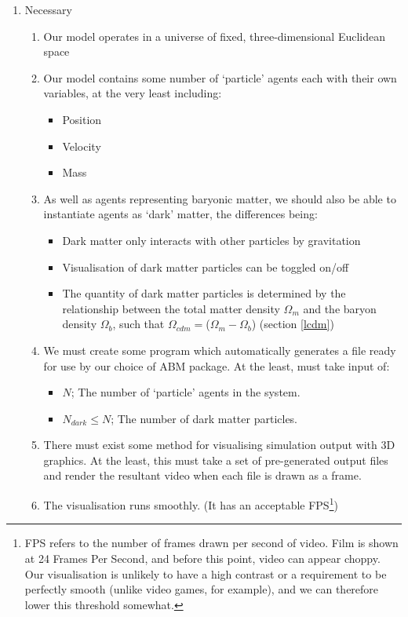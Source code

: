 \documentclass[11pt,a4paper]{article}
\begin{document}
\begin{enumerate}
  \item Necessary
  \begin{enumerate}
    \item Our model operates in a universe of fixed, three-dimensional Euclidean space \label{n1}
    \item Our model contains some number of `particle' agents each with their own variables, at the very least including: \label{n2}
    \begin{itemize}
      \item{Position}
      \item{Velocity}
      \item{Mass}
    \end{itemize}
    \item As well as agents representing baryonic matter, we should also be able to instantiate agents as `dark' matter, the differences being: \label{n3}
    \begin{itemize}
      \item Dark matter only interacts with other particles by gravitation
      \item Visualisation of dark matter particles can be toggled on/off\label{darkVisReq}
      \item The quantity of dark matter particles is determined by the relationship between the total matter density $\Omega_{m}$ and the baryon density $\Omega_{b}$, such that $\Omega_{cdm}=$($\Omega_{m}-\Omega_{b}$) (section \ref{lcdm})
    \end{itemize}
    \item We must create some program which automatically generates a file ready for use by our choice of ABM package. At the least, must take input of: \label{n4}
    \begin{itemize}
      \item $N$; The number of `particle' agents in the system.
      \item $N_{dark} \leq N$; The number of dark matter particles.
    \end{itemize}
    \item There must exist some method for visualising simulation output with 3D graphics. At the least, this must take a set of pre-generated output files and render the resultant video when each file is drawn as a frame. \label{n5}
    \item The visualisation runs smoothly. (It has an acceptable FPS\footnote{FPS refers to the number of frames drawn per second of video. Film is shown at 24 Frames Per Second, and before this point, video can appear choppy. Our visualisation is unlikely to have a high contrast or a requirement to be perfectly smooth (unlike video games, for example), and we can therefore lower this threshold somewhat.})\label{n6}

\end{enumerate}
\end{enumerate}
\end{document}
